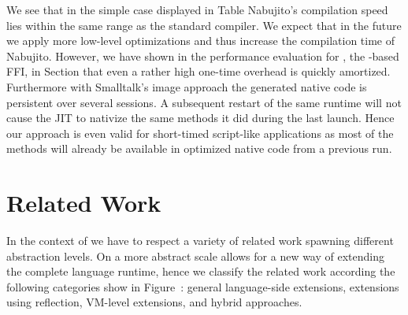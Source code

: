We see that in the simple case displayed in Table  Nabujito's compilation speed lies within the same range as the standard \ST compiler.
We expect that in the future we apply more low-level optimizations and thus increase the compilation time of Nabujito.
However, we have shown in the performance evaluation for \NB, the \B-based FFI, in Section  that even a rather high one-time overhead is quickly amortized.
Furthermore with Smalltalk's image approach the generated native code is persistent over several sessions.
A subsequent restart of the same runtime will not cause the JIT to nativize the same methods it did during the last launch.
Hence our approach is even valid for short-timed script-like applications as most of the methods will already be available in optimized native code from a previous run.


\section{Related Work}

In the context of \B we have to respect a variety of related work spawning different abstraction levels.
On a more abstract scale \B allows for a new way of extending the complete language runtime, hence we classify the related work according the following categories show in Figure~: general language-side extensions, extensions using reflection, VM-level extensions, and hybrid approaches.
%
%
%

